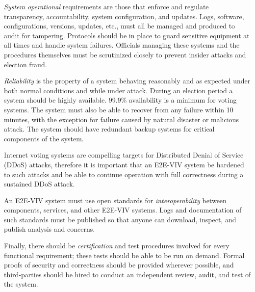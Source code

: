 \emph{System operational} requirements are those that enforce and regulate
transparency, accountability, system configuration, and updates. Logs, software,
configurations, versions, updates, etc., must all be managed and produced to
audit for tampering. Protocols should be in place to guard sensitive equipment
at all times and handle system failures. Officials managing these systems and
the procedures themselves must be scrutinized closely to prevent insider attacks
and election fraud.

\emph{Reliability} is the property of a system behaving reasonably and as
expected under both normal conditions and while under attack. During an election
period a system should be highly available. 99.9\% availability is a minimum for
voting systems. The system must also be able to recover from any failure within
10 minutes, with the exception for failure caused by natural disaster or
malicious attack. The system should have redundant backup systems for critical
components of the system.

Internet voting systems are compelling targets for Distributed Denial of Service
(DDoS) attacks, therefore it is important that an E2E-VIV system be hardened to
such attacks and be able to continue operation with full correctness during a
sustained DDoS attack.

An E2E-VIV system must use open standards for \emph{interoperability} between
components, services, and other E2E-VIV systems. Logs and documentation of such
standards must be published so that anyone can download, inspect, and publish
analysis and concerns.

Finally, there should be \emph{certification} and test procedures involved for
every functional requirement; these tests should be able to be run on demand.
Formal proofs of security and correctness should be provided wherever possible,
and third-parties should be hired to conduct an independent review, audit, and
test of the system.

